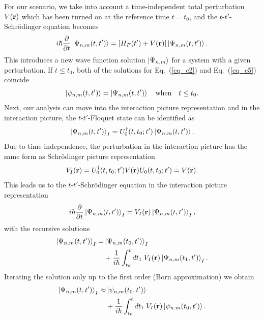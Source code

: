 For our scenario, we take into account a time-independent total perturbation $V(\vb{r})$ which has been turned on at the reference time $t=t_0$, and the $t$-$t'$-Schrödinger equation becomes
\begin{equation} \label{eq_c5}
  i \hbar \pdv{t}\ket{\Psi_{n,m}(t,t')} =
  \qty[H_F(t') + V(\vb{r})]\ket{\Psi_{n,m}(t,t')}.
\end{equation}
This introduces a new wave function solution $\ket{\Psi_{n,m}}$ for a system with a given perturbation. If $t\leq t_0$, both of the solutions for Eq.~(\ref{eq_c2}) and Eq.~(\ref{eq_c5}) coincide
\begin{equation} \label{eq_c6}
  \ket{\psi_{n,m}(t,t')} =\ket{\Psi_{n,m}(t,t')} \quad
  \text{when} \quad
  t \leq t_0.
\end{equation}
Next, our analysis can move into the interaction picture representation \cite{bruus04,mahan00} and in the interaction picture, the $t$-$t'$-Floquet state can be identified as
\begin{equation} \label{eq_c7}
  \ket{\Psi_{n,m}(t,t')}_I = U_0^{\dagger}(t,t_0;t')
  \ket{\Psi_{n,m}(t,t')}.
\end{equation}
Due to time independence, the perturbation in the interaction picture has the same form as Schrödinger picture representation
\begin{equation} \label{eq_c8}
  V_I(\vb{r}) = U_0^{\dagger}(t,t_0;t')V(\vb{r})U_0(t,t_0;t') =
  V(\vb{r}).
\end{equation}
This leads us to the $t$-$t'$-Schrödinger equation in the interaction picture representation
\begin{equation} \label{eq_c9}
  i \hbar \pdv{t}\ket{\Psi_{n,m}(t,t')}_I =
  V_I(\vb{r})\ket{\Psi_{n,m}(t,t')}_I,
\end{equation}
with the recursive solutions \cite{bruus04,mahan00}
\begin{equation} \label{eq_c10}
  \begin{aligned}
  \ket{\Psi_{n,m}(t,t')}_I = &\ket{\Psi_{n,m}(t_0,t')}_I \\
  &+
  \frac{1}{i\hbar}
  \int_{t_0}^t dt_1 \;
  V_I(\vb{r}) \ket{\Psi_{n,m}(t_1,t')}_I.
  \end{aligned}
\end{equation}
Iterating the solution only up to the first order (Born approximation) we obtain
\begin{equation} \label{eq_c11}
  \begin{aligned}
    \ket{\Psi_{n,m}(t,t')}_I \approx &\ket{\psi_{n,m}(t_0,t')} \\
    &+
    \frac{1}{i\hbar}
    \int_{t_0}^t dt_1 \;
    V_I(\vb{r}) \ket{\psi_{n,m}(t_0,t')}.
  \end{aligned}
\end{equation}

